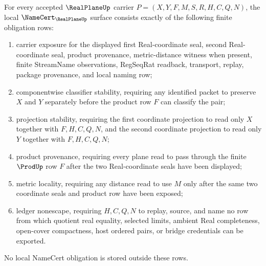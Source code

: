 \begin{theorem}
\label{thm:real-plane-namecert-obligations}
For every accepted $\RealPlaneUp$ carrier $P=(X,Y,F,M,S,R,H,C,Q,N)$, the local $\NameCert_{\RealPlaneUp}$ surface consists exactly of the following finite obligation rows:
\begin{enumerate}
\item carrier exposure for the displayed first Real-coordinate seal, second Real-coordinate seal, product provenance, metric-distance witness when present, finite StreamName observations, RegSeqRat readback, transport, replay, package provenance, and local naming row;
\item componentwise classifier stability, requiring any identified packet to preserve $X$ and $Y$ separately before the product row $F$ can classify the pair;
\item projection stability, requiring the first coordinate projection to read only $X$ together with $F,H,C,Q,N$, and the second coordinate projection to read only $Y$ together with $F,H,C,Q,N$;
\item product provenance, requiring every plane read to pass through the finite $\ProdUp$ row $F$ after the two Real-coordinate seals have been displayed;
\item metric locality, requiring any distance read to use $M$ only after the same two coordinate seals and product row have been exposed;
\item ledger nonescape, requiring $H,C,Q,N$ to replay, source, and name no row from which quotient real equality, selected limits, ambient Real completeness, open-cover compactness, host ordered pairs, or bridge credentials can be exported.
\end{enumerate}
No local NameCert obligation is stored outside these rows.
\end{theorem}
